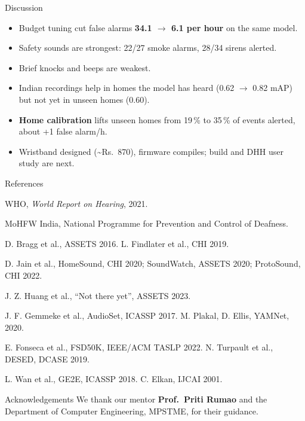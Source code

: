 \documentclass{article}
\begin{document}
\begin{minipage}[t]{0.235\linewidth}\vspace{0pt}
\begin{psec}{Discussion}
\begin{itemize}
\item Budget tuning cut false alarms \textbf{34.1 $\rightarrow$ 6.1 per hour} on the same model.
\item Safety sounds are strongest: 22/27 smoke alarms, 28/34 sirens alerted.
\item Brief knocks and beeps are weakest.
\item Indian recordings help in homes the model has heard (0.62 $\rightarrow$ 0.82 mAP) but not yet in unseen homes (0.60).
\item \textbf{Home calibration} lifts unseen homes from 19\,\% to 35\,\% of events alerted, about +1 false alarm/h.
\item Wristband designed (\textasciitilde Rs.~870), firmware compiles; build and DHH user study are next.
\end{itemize}
\end{psec}

\begin{psec}{References}
{\fontsize{15}{18}\selectfont
\begin{enumerate}[leftmargin=8mm, itemsep=1pt, label={[\arabic*]}]
\item WHO, \textit{World Report on Hearing}, 2021.
\item MoHFW India, National Programme for Prevention and Control of Deafness.
\item D. Bragg et al., ASSETS 2016. \quad L. Findlater et al., CHI 2019.
\item D. Jain et al., HomeSound, CHI 2020; SoundWatch, ASSETS 2020; ProtoSound, CHI 2022.
\item J. Z. Huang et al., ``Not there yet'', ASSETS 2023.
\item J. F. Gemmeke et al., AudioSet, ICASSP 2017. \quad M. Plakal, D. Ellis, YAMNet, 2020.
\item E. Fonseca et al., FSD50K, IEEE/ACM TASLP 2022. \quad N. Turpault et al., DESED, DCASE 2019.
\item L. Wan et al., GE2E, ICASSP 2018. \quad C. Elkan, IJCAI 2001.
\end{enumerate}}
\end{psec}

\begin{psec}{Acknowledgements}
We thank our mentor \textbf{Prof.\ Priti Rumao} and the Department of Computer Engineering, MPSTME, for their guidance.
\end{psec}


\end{minipage}
\end{document}
